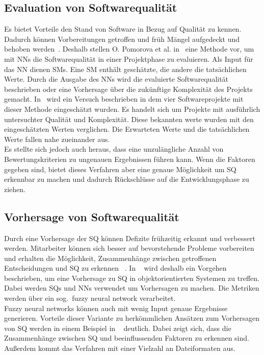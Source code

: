 \subsection{Evaluation von Softwarequalität}
Es bietet Vorteile den Stand von Software in Bezug auf Qualität zu kennen. Dadurch können Vorbereitungen getroffen und früh Mängel aufgedeckt und behoben werden~\cite{Pomorova2013}. Deshalb stellen O. Pomorova et al. in~\cite{Pomorova2013} eine Methode vor, um mit NNs die Softwarequalität in einer Projektphase zu evaluieren. Als Input für das NN dienen SMs. Eine SM enthält geschätzte, die andere die tatsächlichen Werte.
Durch die Ausgabe des NNs wird die evaluierte Softwarequalität beschrieben oder eine Vorhersage über die zukünftige Komplexität des Projekts gemacht. 
In~\cite{Pomorova2013} wird ein Versuch beschrieben in dem vier Softwareprojekte mit dieser Methode eingeschätzt wurden. Es handelt sich um Projekte mit ausführlich untersuchter Qualität und Komplexität. Diese bekannten werte wurden mit den eingeschätzten Werten verglichen. Die Erwarteten Werte und die tatsächlichen Werte fallen nahe zueinander aus.
\\
Es stellte sich jedoch auch heraus, dass eine unzulängliche Anzahl von Bewertungskriterien zu ungenauen Ergebnissen führen kann.
Wenn die Faktoren gegeben sind, bietet dieses Verfahren aber eine genaue Möglichkeit um SQ erkennbar zu machen und dadurch Rückschlüsse auf die Entwicklungsphase zu ziehen.

\subsection{Vorhersage von Softwarequalität}
Durch eine Vorhersage der SQ können Defizite frühzeitig erkannt und verbes\-sert werden. Mitarbeiter können sich besser auf bevorstehende Probleme vorbereiten und erhalten die Möglichkeit, Zusammenhänge zwischen getrof\-fenen Entscheidungen und SQ zu erkennen ~\cite{Peng2009}. In ~\cite{Peng2009} wird deshalb ein Vorgehen beschrieben, um eine Vorhersage zu SQ in objektorientierten Systemen zu tref\-fen. Dabei werden SQs und NNs verwendet um Vorhersagen zu machen. Die Metriken werden über ein sog.~fuzzy neural network verarbeitet.\\
Fuzzy neural networks können auch mit wenig Input genaue Ergebnisse generieren.
Vorteile dieser Variante zu herkömmlichen Ansätzen zum Vorhersagen von SQ werden in einem Beispiel in ~\cite{Peng2009} deutlich. Dabei zeigt sich, dass die Zusammenhänge zwischen SQ und beeinflussenden Faktoren zu erkennen sind. Außerdem kommt das Verfahren mit einer Vielzahl an Dateiformaten aus.